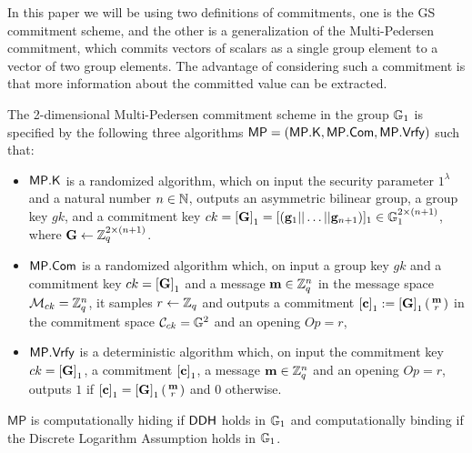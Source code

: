 In this paper we will be using two definitions of commitments, one is the GS commitment scheme, and the other is a generalization of the Multi-Pedersen commitment, which commits vectors of scalars as a single group element to a vector of two group elements. The advantage of considering such a commitment is that more information about the committed value can be extracted. 



\begin{definition} The 2-dimensional Multi-Pedersen commitment scheme in the group $\mathbb{G}_1$ is specified by the following three algorithms 
	$\mathsf{MP}=(\mathsf{MP}.\mathsf{K},\mathsf{MP}.\mathsf{Com},\mathsf{MP}.\mathsf{Vrfy})$ such that:
	\begin{itemize} 
		\item  $\mathsf{MP}.\mathsf{K}$ is a randomized algorithm, which on input the security parameter 
		$1^{\lambda}$ and a natural number $n \in \mathbb{N}$, outputs an asymmetric bilinear group, a group key $gk$, and a commitment key $ck=\left[\mathbf{{G}}\right]_1=[(\mathbf{g}_1||\ldots||\mathbf{g}_{n+1})]_1 \in \mathbb{G}_1^{2 \times (n+1)}$, where $\mathbf{{G}}\gets\mathbb{Z}_q^{2\times(n+1)}$.
		\item $\mathsf{MP}.\mathsf{Com}$ is a randomized algorithm which, on input a group key $gk$ and a commitment key $ck=\left[\mathbf{{G}}\right]_1$ and a message 
		$\mathbf{m} \in \mathbb{Z}_q^{n}$ in the message space $\mathcal{M}_{ck}=\mathbb{Z}_q^{n}$, it samples $r \gets \mathbb{Z}_q$ and outputs a commitment $\left[\mathbf{c}\right]_1:=\left[\mathbf{{G}}\right]_1\left(\begin{smallmatrix}\mathbf{m} \\ r\end{smallmatrix}\right)$ in the commitment space $\mathcal{C}_{ck}=\mathbb{G}^2$ and an opening $Op=r$, 
		\item $\mathsf{MP}.\mathsf{Vrfy}$ is a deterministic algorithm which, on input the commitment key $ck=\left[\mathbf{{G}}\right]_1$, a commitment $\left[\mathbf{c}\right]_1$,  a message 
		$\mathbf{m} \in \mathbb{Z}_q^{n}$ and an opening $Op=r$, outputs $1$ if $\left[\mathbf{c}\right]_1=\left[\mathbf{{G}}\right]_1\left(\begin{smallmatrix}\mathbf{m} \\ r \end{smallmatrix}\right)$
		and $0$ otherwise. 
	\end{itemize}
\end{definition}


\begin{theorem} $\mathsf{MP}$ is computationally hiding if $\mathsf{DDH}$ holds in $\mathbb{G}_1$ and computationally binding if the Discrete Logarithm Assumption holds in $\mathbb{G}_1$.
\end{theorem}


